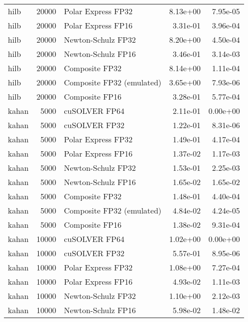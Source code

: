 \begin{table}
\begin{tabular}{lrlrr}
     hilb & 20000 &        Polar Express FP32 &  8.13e+00 &        7.95e-05 \\
     hilb & 20000 &        Polar Express FP16 &  3.31e-01 &        3.96e-04 \\
     hilb & 20000 &        Newton-Schulz FP32 &  8.20e+00 &        4.50e-04 \\
     hilb & 20000 &        Newton-Schulz FP16 &  3.46e-01 &        3.14e-03 \\
     hilb & 20000 &            Composite FP32 &  8.14e+00 &        1.11e-04 \\
     hilb & 20000 & Composite FP32 (emulated) &  3.65e+00 &        7.93e-06 \\
     hilb & 20000 &            Composite FP16 &  3.28e-01 &        5.77e-04 \\
    kahan &  5000 &             cuSOLVER FP64 &  2.11e-01 &        0.00e+00 \\
    kahan &  5000 &             cuSOLVER FP32 &  1.22e-01 &        8.31e-06 \\
    kahan &  5000 &        Polar Express FP32 &  1.49e-01 &        4.17e-04 \\
    kahan &  5000 &        Polar Express FP16 &  1.37e-02 &        1.17e-03 \\
    kahan &  5000 &        Newton-Schulz FP32 &  1.53e-01 &        2.25e-03 \\
    kahan &  5000 &        Newton-Schulz FP16 &  1.65e-02 &        1.65e-02 \\
    kahan &  5000 &            Composite FP32 &  1.48e-01 &        4.40e-04 \\
    kahan &  5000 & Composite FP32 (emulated) &  4.84e-02 &        4.24e-05 \\
    kahan &  5000 &            Composite FP16 &  1.38e-02 &        9.31e-04 \\
    kahan & 10000 &             cuSOLVER FP64 &  1.02e+00 &        0.00e+00 \\
    kahan & 10000 &             cuSOLVER FP32 &  5.57e-01 &        8.95e-06 \\
    kahan & 10000 &        Polar Express FP32 &  1.08e+00 &        7.27e-04 \\
    kahan & 10000 &        Polar Express FP16 &  4.93e-02 &        1.11e-03 \\
    kahan & 10000 &        Newton-Schulz FP32 &  1.10e+00 &        2.12e-03 \\
    kahan & 10000 &        Newton-Schulz FP16 &  5.98e-02 &        1.48e-02 \\

\end{tabular}
\end{table}
